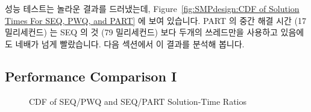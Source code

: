 성능 테스트는 놀라운 결과를 드러냈는데,
Figure~\ref{fig:SMPdesign:CDF of Solution Times For SEQ, PWQ, and PART} 에 보여
있습니다.
PART 의 중간 해결 시간 (17 밀리세컨드) 는 SEQ 의 것 (79 밀리세컨드) 보다 두개의
쓰레드만을 사용하고 있음에도 네배가 넘게 빨랐습니다.
다음 섹션에서 이 결과를 분석해 봅니다.

\subsection{Performance Comparison I}
\label{sec:SMPdesign:Performance Comparison I}

\begin{figure}[tb]
\centering
{}
\caption{CDF of SEQ/PWQ and SEQ/PART Solution-Time Ratios}
\label{fig:SMPdesign:CDF of SEQ/PWQ and SEQ/PART Solution-Time Ratios}
\end{figure}

